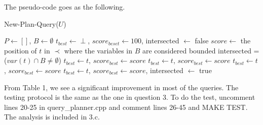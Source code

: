 \documentclass{article}
\begin{document}
\begin{enumerate}
\begin{enumerate}
The pseudo-code goes as the following. 

\begin{algorithm}[H]
\caption{New-Plan-Query($U$)}\label{alg:greedy}
\begin{algorithmic}

\State $P \leftarrow []$, $B\leftarrow \emptyset$
\State $t_{best}\leftarrow \perp$, $score_{beset} \leftarrow 100$, intersected $\leftarrow$ false
\State $score \leftarrow$ the position of $t$ in $\prec$ where the variables in $B$ are considered bounded
\State intersected = ($var(t) \cap B \neq \emptyset$)
\State $t_{best} \leftarrow t$, $score_{best} \leftarrow score$
\EndIf
{}
\State $t_{best} \leftarrow t$, $score_{best} \leftarrow score$
\EndIf
\EndIf
{}
\State $t_{best} \leftarrow t$, $score_{best} \leftarrow score$
\EndIf
\Else
{} 
\State $t_{best} \leftarrow t$, $score_{best} \leftarrow score$, intersected $\leftarrow$ true
\EndIf
\EndIf

\EndFor
\EndWhile

\end{algorithmic}
\end{algorithm}


From Table 1, we see a significant improvement in most of the queries. The testing protocol is the same as the one in question 3. To do the test, uncomment lines 20-25 in query\_planner.cpp and comment lines 26-45 and MAKE TEST. The analysis is included in 3.c.


\end{enumerate}
\end{enumerate}
\end{document}
